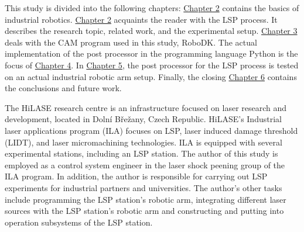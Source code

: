 This study is divided into the following chapters: \hyperref[chap:basics]{Chapter 2} contains the basics of industrial robotics. \hyperref[chap:peening]{Chapter 2} acquaints the reader with the LSP process.  It describes the research topic, related work, and the experimental setup.  
\hyperref[chap:design]{Chapter 3} deals with the CAM program used in this study, RoboDK. The actual implementation of the post processor in the programming language Python is the focus of \hyperref[chap:implementation]{Chapter 4}. In \hyperref[chap:testing]{Chapter 5}, the post processor for the LSP process is tested on an actual industrial robotic arm setup. Finally, the closing \hyperref[chap:discussion]{Chapter 6} contains the conclusions and future work. 

The HiLASE research centre is an infrastructure focused on laser research and development, located in Dolní Břežany, Czech Republic. HiLASE's Industrial laser applications program (ILA) focuses on LSP, laser induced damage threshold (LIDT), and laser micromachining technologies. ILA is equipped with several experimental stations, including an LSP station. The author of this study is employed as a control system engineer in the laser shock peening group of the ILA program. In addition, the author is responsible for carrying out LSP experiments for industrial partners and universities. The author's other tasks include programming the LSP station's robotic arm, integrating different laser sources with the  LSP station's robotic arm and constructing and putting into operation subsystems of the LSP station.




